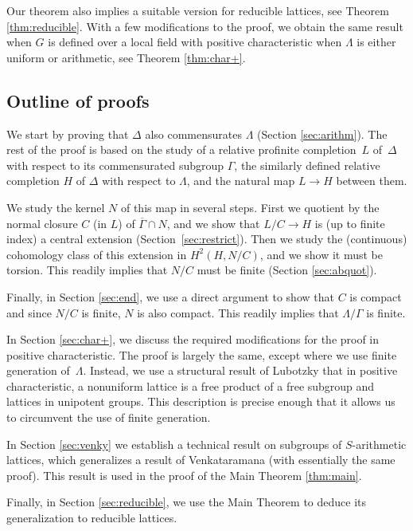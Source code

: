 \documentclass[JEP,XML,SOM,Unicode,published]{cedram}
\theoremstyle{definition}
\begin{document}
Our theorem also implies a suitable version for reducible lattices, see Theorem \ref{thm:reducible}. With a few modifications to the proof, we obtain the same result when $G$ is defined over a local field with positive characteristic when $\Lambda$ is either uniform or arithmetic, see Theorem \ref{thm:char+}.

\subsection{Outline of proofs}\label{sec:outline}
We start by proving that $\Delta$ also commensurates $\Lambda$ (Section \ref{sec:arithm}). The rest of the proof is based on the study of a relative profinite completion~$L$ of~$\Delta$ with respect to its commensurated subgroup $\Gamma$, the similarly defined relative completion $H$ of $\Delta$ with respect to $\Lambda$, and the natural map $L\to H$ between them.

We study the kernel $N$ of this map in several steps. First we quotient by the normal closure $C$ (in $L$) of $\overline{\Gamma}\cap N$, and we show that $L/C\to H$ is (up to finite index) a central extension (Section~\ref{sec:restrict}). Then we study the (continuous) cohomology class of this extension in $H^2(H,N/C)$, and we show it must be torsion. This readily implies that $N/C$ must be finite (Section \ref{sec:abquot}).

Finally, in Section \ref{sec:end}, we use a direct argument to show that $C$ is compact and since $N/C$ is finite, $N$ is also compact. This readily implies that $\Lambda/\Gamma$ is finite.

In Section \ref{sec:char+}, we discuss the required modifications for the proof in positive characteristic. The proof is largely the same, except where we use finite generation of~$\Lambda$. \hbox{Instead}, we use a structural result of Lubotzky that in positive characteristic, a nonuniform lattice is a free product of a free subgroup and lattices in unipotent groups. This description is precise enough that it allows us to circumvent the use of finite generation.

In Section \ref{sec:venky} we establish a technical result on subgroups of $S$-arithmetic lattices, which generalizes a result of Venkataramana (with essentially the same proof). This result is used in the proof of the Main Theorem \ref{thm:main}.

Finally, in Section \ref{sec:reducible}, we use the Main Theorem to deduce its generalization to reducible lattices.
\end{document}
